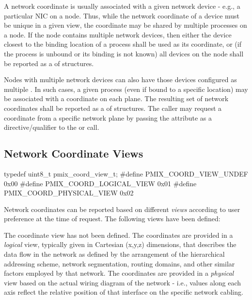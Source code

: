 A network coordinate is usually associated with a given network device - e.g., a particular \ac{NIC} on a node. Thus, while the network coordinate of a device must be unique in a given view, the coordinate may be shared by multiple processes on a node. If the node contains multiple network devices, then either the device closest to the binding location of a process shall be used as its coordinate, or (if the process is unbound or its binding is not known) all devices on the node shall be reported as a  of  structures.

Nodes with multiple network devices can also have those devices configured as multiple . In such cases, a given process (even if bound to a specific location) may be associated with a coordinate on each plane. The resulting set of network coordinates shall be reported as a  of  structures. The caller may request a coordinate from a specific network plane by passing the  attribute as a directive/qualifier to the  or  call.

\subsection{Network Coordinate Views}

\cspecificstart
\begin{codepar}
typedef uint8_t pmix_coord_view_t;
#define PMIX_COORD_VIEW_UNDEF       0x00
#define PMIX_COORD_LOGICAL_VIEW     0x01
#define PMIX_COORD_PHYSICAL_VIEW    0x02
\end{codepar}
\cspecificend

Network coordinates can be reported based on different \emph{views} according to user preference at the time of request. The following views have been defined:

\begin{constantdesc}
%
The coordinate view has not been defined.
%
The coordinates are provided in a \emph{logical} view, typically given in Cartesian (x,y,z) dimensions, that describes the data flow in the network as defined by the arrangement of the hierarchical addressing scheme, network segmentation, routing domains, and other similar factors employed by that network.
%
The coordinates are provided in a \emph{physical} view based on the actual wiring diagram of the network - i.e., values along each axis reflect the relative position of that interface on the specific network cabling.
%
\end{constantdesc}

